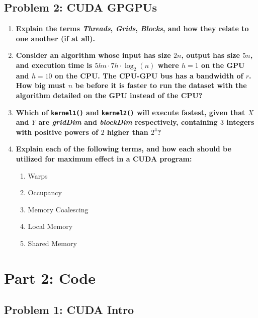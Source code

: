 \subsection*{Problem 2: CUDA GPGPUs}

\begin{enumerate}

\item \textbf{Explain the terms \textit{Threads}, \textit{Grids}, \textit{Blocks}, and how they relate to one another (if at all).}

\item \textbf{Consider an algorithm whose input has size $2n$, output has size $5n$, and execution time is $5hn \cdot 7h \cdot \log_2(n)$ where $h = 1$ on the GPU and $h = 10$ on the CPU. The CPU-GPU bus has a bandwidth of $r$. How big must $n$ be before it is faster to run the dataset with the algorithm detailed on the GPU instead of the CPU?}

\item \textbf{Which of \texttt{kernel1()} and \texttt{kernel2()} will execute fastest, given that $X$ and $Y$ are \textit{gridDim} and \textit{blockDim} respectively, containing $3$ integers with positive powers of $2$ higher than $2^4$?}

\item \textbf{Explain each of the following terms, and how each should be utilized for maximum effect in a CUDA program:}

\begin{enumerate}
\item Warps
\item Occupancy
\item Memory Coalescing
\item Local Memory
\item Shared Memory
\end{enumerate}

\end{enumerate}

\section*{Part 2: Code}

\subsection*{Problem 1: CUDA Intro}

